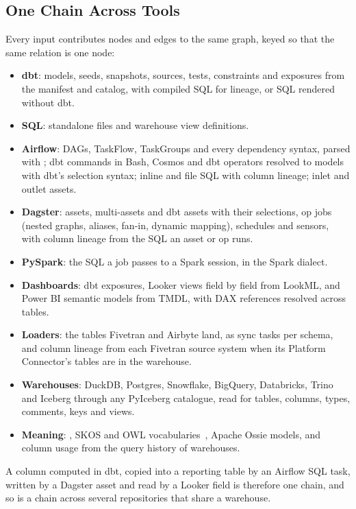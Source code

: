 \subsection{One Chain Across Tools}
\label{sec:chains}

Every input contributes nodes and edges to the same graph, keyed so that the same relation is one
node:
\begin{itemize}
  \item \textbf{dbt}: models, seeds, snapshots, sources, tests, constraints and exposures from the
  manifest and catalog, with compiled SQL for lineage, or SQL rendered without dbt.
  \item \textbf{SQL}: standalone files and warehouse view definitions.
  \item \textbf{Airflow}: DAGs, TaskFlow, TaskGroups and every dependency syntax, parsed with
  ; dbt commands in Bash, Cosmos and dbt operators resolved to models with dbt's selection
  syntax; inline and file SQL with column lineage; inlet and outlet assets.
  \item \textbf{Dagster}: assets, multi-assets and dbt assets with their selections, op jobs
  (nested graphs, aliases, fan-in, dynamic mapping), schedules and sensors, with column lineage
  from the SQL an asset or op runs.
  \item \textbf{PySpark}: the SQL a job passes to a Spark session, in the Spark dialect.
  \item \textbf{Dashboards}: dbt exposures, Looker views field by field from LookML, and Power BI
  semantic models from TMDL, with DAX references resolved across tables.
  \item \textbf{Loaders}: the tables Fivetran and Airbyte land, as sync tasks per schema, and
  column lineage from each Fivetran source system when its Platform Connector's tables are in the
  warehouse.
  \item \textbf{Warehouses}: DuckDB, Postgres, Snowflake, BigQuery, Databricks, Trino and Iceberg
  through any PyIceberg catalogue, read for tables, columns, types, comments, keys and views.
  \item \textbf{Meaning}: , SKOS and OWL vocabularies~\citep{skos,owl2},
  Apache Ossie models, and column usage from the query history of \usageWarehouses{} warehouses.
\end{itemize}
A column computed in dbt, copied into a reporting table by an Airflow SQL task, written by a
Dagster asset and read by a Looker field is therefore one chain, and so is a chain across several
repositories that share a warehouse.


